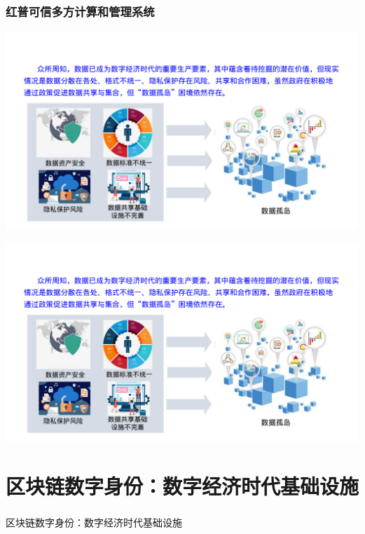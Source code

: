 \documentclass[11pt]{beamer}
\begin{document}
\begin{frame}[allowframebreaks]
	\frametitle{红普可信多方计算和管理系统}
	\includegraphics[page=1,width=\textwidth]{figures/gov/hmb.pdf}
	
	\includegraphics[page=2,width=\textwidth]{figures/gov/hmb.pdf}
\end{frame}



\section{区块链数字身份：数字经济时代基础设施}

\begin{frame}
	\frametitle{}
{\Large 	区块链数字身份：数字经济时代基础设施}
\end{frame}
\end{document}
